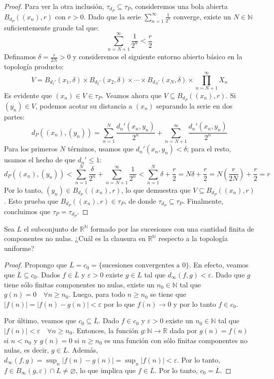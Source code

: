 \documentclass{article}
\theoremstyle{plain}
\theoremstyle{definition}
\newcommand{\R}{\mathbb{R}}
\newcommand{\N}{\mathbb{N}}
\newcommand{\cl}[1]{\overline{#1}}              %
\newenvironment{ejercicio}[1]{\begin{trivlist}
\item[\hskip \labelsep {\bfseries Ejercicio}\hskip \labelsep {\bfseries #1.}]}{\end{trivlist}}
\begin{document}
\begin{proof}
    Para ver la otra inclusión, \( \tau_{d_P} \subseteq \tau_P \), consideremos una bola abierta \( B_{d_P}({(x_n)}, r) \) con \( r > 0 \). Dado que la serie \( \sum_{n=1}^{\infty} \frac{1}{2^n} \) converge, existe un \( N \in \mathbb{N} \) suficientemente grande tal que:
    \[
        \sum_{n=N+1}^{\infty} \frac{1}{2^n} < \frac{r}{2}
    \]
    Definamos \( \delta = \frac{r}{2N} > 0 \) y consideremos el siguiente entorno abierto básico en la topología producto:
    \[
        V = B_{d_1'}(x_1, \delta) \times B_{d_2'}(x_2, \delta) \times \cdots \times B_{d_N'}(x_N, \delta) \times \prod_{n=N+1}^{\infty} X_n
    \]
    Es evidente que \( {(x_n)} \in V \in \tau_P \). Veamos ahora que \( V \subseteq B_{d_P}({(x_n)}, r) \). Si \( {(y_n)} \in V \), podemos acotar su distancia a \( {(x_n)} \) separando la serie en dos partes:
    \[
        d_P({(x_n)}, {(y_n)}) = \sum_{n=1}^{N} \frac{d_n'(x_n, y_n)}{2^n} + \sum_{n=N+1}^{\infty} \frac{d_n'(x_n, y_n)}{2^n}
    \]
    Para los primeros \( N \) términos, usamos que \( d_n'(x_n, y_n) < \delta \); para el resto, usamos el hecho de que \( d_n' \leq 1 \):
    \[
        d_P({(x_n)}, {(y_n)}) < \sum_{n=1}^{N} \frac{\delta}{2^n} + \sum_{n=N+1}^{\infty} \frac{1}{2^n} < \sum_{n=1}^{N} \delta + \frac{r}{2} = N\delta + \frac{r}{2} = N\left(\frac{r}{2N}\right) + \frac{r}{2} = r
    \]
    Por lo tanto, \( {(y_n)} \in B_{d_P}({(x_n)}, r) \), lo que demuestra que \( V \subseteq B_{d_P}({(x_n)}, r) \). Esto prueba que \( B_{d_P}({(x_n)}, r) \in \tau_P \), de donde \( \tau_{d_P} \subseteq \tau_P \). Finalmente, concluimos que \( \tau_P = \tau_{d_P} \).
\end{proof}

\begin{ejercicio}{5}
    Sea \( L \) el subconjunto de \( \R^{\N} \) formado por las sucesiones con una cantidad finita de componentes no nulas. ¿Cuál es la clausura en \( \R^{\N} \) respecto a la topología uniforme?
\end{ejercicio}
\begin{proof}
    Propongo que \( \cl{L} = c_0 = \{ \text{sucesiones convergentes a 0} \} \). En efecto,
    veamos que \( \cl{L} \subseteq c_0 \). Dados \( f \in \cl{L} \) y \( \varepsilon > 0 \) existe \( g \in L \) tal que \( d_\infty(f, g) < \varepsilon \). Dado que \( g \) tiene sólo finitas componentes no nulas,
    existe un \( n_0 \in \N \) tal que \( g(n) = 0 \quad \forall n \geq n_0 \). Luego, para todo \( n \geq n_0 \) se tiene que \( |f(n)| = |f(n) - g(n)| < \varepsilon \) por lo que \( f(n) \to 0 \) y por lo tanto \( f \in c_0 \).

    Por último, veamos que \( c_0 \subseteq \cl{L} \). Dado \( f \in c_0 \) y \( \varepsilon > 0 \) existe un \( n_0 \in \N \) tal que \( |f(n)| < \varepsilon \quad \forall n \geq n_0 \). Entonces, la función \( g : \N \to \R \) dada por \( g(n) = f(n) \) si \( n < n_0 \) y \( g(n) = 0 \) si \( n \geq n_0 \) es una función con sólo finitas componentes no nulas, es decir, \( g \in L \). Además, \( d_\infty(f, g) = \sup_{n} |f(n) - g(n)| = \sup_{n} |f(n)| < \varepsilon \). Por lo tanto, \( f \in B_\infty(g, \varepsilon) \cap L \neq \varnothing \), lo que implica que \( f \in \cl{L} \). Por lo tanto, \( c_0 = \cl{L} \).
\end{proof}
\end{document}
